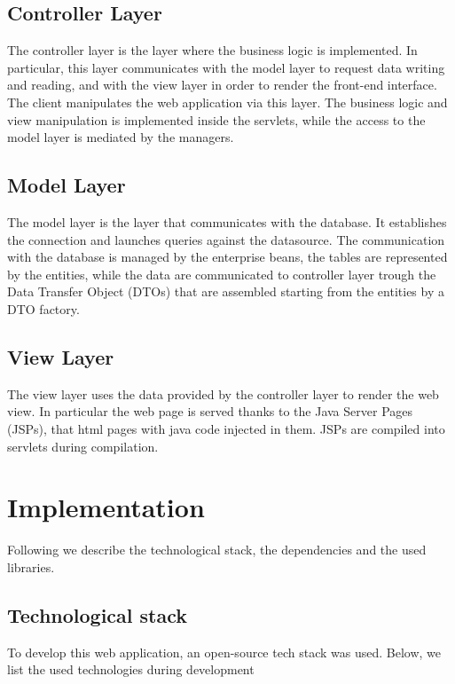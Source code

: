 \subsection{Controller Layer}
The controller layer is the layer where the business logic is implemented. In particular, this layer communicates with the model layer to request data writing and reading, and with the view layer in order to render the front-end interface. The client manipulates the web application via this layer. The business logic and view manipulation is implemented inside the servlets, while the access to the model layer is mediated by the managers.

\subsection{Model Layer}
The model layer is the layer that communicates with the database. It establishes the connection and launches queries against the datasource. The communication with the database is managed by the enterprise beans, the tables are represented by the entities, while the data are communicated to controller layer trough the Data Transfer Object (DTOs) that are assembled starting from the entities by a DTO factory. 

\subsection{View Layer}
\label{ss:viewLayer}
The view layer uses the data provided by the controller layer to render the web view. In particular the web page is served thanks to the Java Server Pages (JSPs), that html pages with java code injected in them. JSPs are compiled into servlets during compilation.

\section{Implementation}

Following we describe the technological stack, the dependencies and the used libraries.

\subsection*{Technological stack}

To develop this web application, an open-source tech stack was used. Below, we list the used technologies during development


